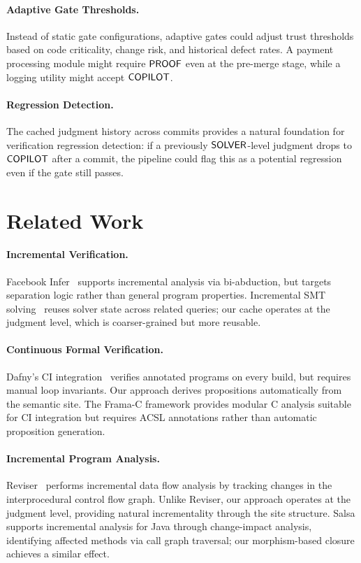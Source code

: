 \documentclass[11pt]{article}
\begin{document}
\paragraph{Adaptive Gate Thresholds.}
Instead of static gate configurations, adaptive gates could adjust trust
thresholds based on code criticality, change risk, and historical defect
rates. A payment processing module might require $\mathsf{PROOF}$ even at the
pre-merge stage, while a logging utility might accept $\mathsf{COPILOT}$.

\paragraph{Regression Detection.}
The cached judgment history across commits provides a natural foundation for
verification regression detection: if a previously $\mathsf{SOLVER}$-level judgment
drops to $\mathsf{COPILOT}$ after a commit, the pipeline could flag this as a
potential regression even if the gate still passes.

\section{Related Work}\label{sec:related}

\paragraph{Incremental Verification.}
Facebook Infer~\cite{calcagno2015infer} supports incremental analysis via
bi-abduction, but targets separation logic rather than general program
properties. Incremental SMT solving~\cite{cimatti2010incremental} reuses
solver state across related queries; our cache operates at the judgment level,
which is coarser-grained but more reusable.

\paragraph{Continuous Formal Verification.}
Dafny's CI integration~\cite{leino2010dafny} verifies annotated programs on
every build, but requires manual loop invariants. Our approach derives
propositions automatically from the semantic site. The Frama-C framework
provides modular C analysis suitable for CI integration but requires ACSL
annotations rather than automatic proposition generation.

\paragraph{Incremental Program Analysis.}
Reviser~\cite{arzt2014reviser} performs incremental data flow analysis by
tracking changes in the interprocedural control flow graph. Unlike Reviser,
our approach operates at the judgment level, providing natural incrementality
through the site structure. Salsa supports incremental analysis for Java
through change-impact analysis, identifying affected methods via call graph
traversal; our morphism-based closure achieves a similar effect.
\end{document}
